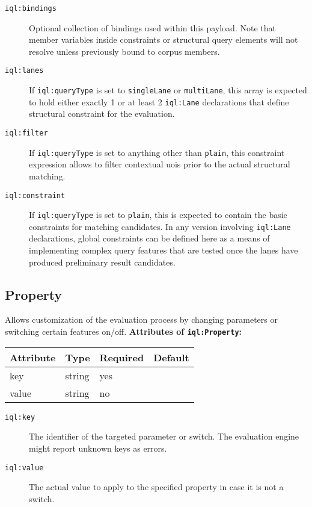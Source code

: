 \documentclass[11pt,a4paper,portrait]{article}
\newcommand{\iqlns}{iql:}
\newcommand{\iqlType}[1]{\texttt{\iqlns#1}}
\newcommand{\desc}[1]{\noindent#1\newline\medskip}
\newenvironment{attributes}[1]{
\noindent\textbf{Attributes of #1:}\newline\medskip
\begin{tabular}{|p{0.3\textwidth}|p{0.20\textwidth}|p{0.20\textwidth}|p{0.17\textwidth}|}
	\hline
	\textbf{Attribute} & \textbf{Type} & \textbf{Required} & \textbf{Default} \\ 
	\hline
	\hline
}{
\end{tabular}
}
\newcommand{\attribute}[4]{
	#1 & #2 & #3 & #4 \\
	\hline
}
\begin{document}
\begin{description}
	\item[\iqlType{bindings}] Optional collection of bindings used within this payload. Note that member variables inside constraints or structural query elements will not resolve unless previously bound to corpus members.
	\item[\iqlType{lanes}] If \iqlType{queryType} is set to \texttt{singleLane} or \texttt{multiLane}, this array is expected to hold either exactly 1 or at least 2 \iqlType{Lane} declarations that define structural constraint for the evaluation.
	\item[\iqlType{filter}] If \iqlType{queryType} is set to anything other than \texttt{plain}, this constraint expression allows to filter contextual \acp{uoi} prior to the actual structural matching.
	\item[\iqlType{constraint}] If \iqlType{queryType} is set to \texttt{plain}, this is expected to contain the basic constraints for matching candidates. In any version involving \iqlType{Lane} declarations, global constraints can be defined here as a means of implementing complex query features that are tested once the lanes have produced preliminary result candidates.
\end{description}

\subsection{Property}
\label{sec:json-ld-property}
\desc{Allows customization of the evaluation process by changing parameters or switching certain features on/off.}
\begin{attributes}{\iqlType{Property}}
	\attribute{key}{string}{yes}{}
	\attribute{value}{string}{no}{}
\end{attributes}
\begin{description}
	\item[\iqlType{key}] The identifier of the targeted parameter or switch. The evaluation engine might report unknown keys as errors.
	\item[\iqlType{value}] The actual value to apply to the specified property in case it is not a switch.
\end{description}
\end{document}
